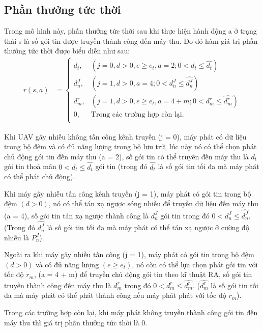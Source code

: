 \documentclass{uetgraduation}
\begin{document}
\subsection{Phần thưởng tức thời}
Trong mô hình này, phần thưởng tức thời sau khi thực hiện hành động a ở trạng thái s là số gói tin được truyền thành công đến máy thu. Do đó hàm giá
trị phần thưởng tức thời được biểu diễn như sau:
\begin{equation}
    \begin{split}
        r(s,a) &= \begin{cases}
            d_t, & (j = 0, d > 0, e \geq e_t, a = 2; 0 < d_t \leq \hat{d_t}) \\
            d_n^J, & (j = 1, d > 0, a = 4; 0 < d_n^J \leq \hat{d_n^J}) \\
            d_m^r, & (j = 1, d > 0, e \geq e_t, a = 4 + m; 0 < d_m^r \leq \hat{d_m^r}) \\
            0, & \text{Trong các trường hợp còn lại.} \\
        \end{cases}
    \end{split}
\end{equation}

Khi UAV gây nhiễu không tấn công kênh truyền (j = 0), máy phát có dữ liệu trong bộ đệm và có đủ năng lượng trong bộ lưu trữ, lúc này nó có thể chọn phát
chủ động gói tin đến máy thu (a = 2), số gói tin có thể truyền đến máy thu là $d_t$ gói tin thoả mãn $0 < d_t \leq \hat{d_t}$ gói tin (trong đó $\hat{d_t}$
là số gói tin tối đa mà máy phát có thể phát chủ động).

Khi máy gây nhiễu tấn công kênh truyền (j = 1), máy phát có gói tin trong bộ đệm $(d > 0)$, nó có thể tán xạ ngược sóng nhiễu để truyền dữ liệu đến máy thu (a = 4), 
số gói tin tán xạ ngược thành công là $d_n^J$ gói tin trong đó $0 < d_n^J \leq \hat{d_n^J}$. (Trong đó $\hat{d_n^J}$ là số gói tin tối đa mà máy phát có thể tán xạ ngược
ở cường độ nhiễu là $P_n^J$).

Ngoài ra khi máy gây nhiễu tấn công (j = 1), máy phát có gói tin trong bộ đệm $(d > 0)$ và có đủ năng lượng $(e \geq e_t)$, nó còn có thể lựa chọn phát gói 
tin với tốc độ $r_m$, (a = 4 + m) để truyền chủ động gói tin theo kĩ thuật RA, số gói tin truyền thành công đến máy thu là $d_m^r$ trong đó $0 < d_m^r \leq \hat{d_m^r}$.
($\hat{d_m^r}$ là số gói tin tối đa mà máy phát có thể phát thành công nếu máy phát phát với tốc độ $r_m$).

Trong các trường hợp còn lại, khi máy phát không truyền thành công gói tin đến máy thu thì giá trị phần thưởng tức thời là 0.
\end{document}
